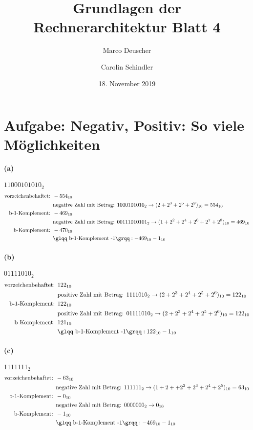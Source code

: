\documentclass[a4paper]{article}
\title{Grundlagen der Rechnerarchitektur Blatt 4}
\author{Marco Deuscher \and Carolin Schindler}
\date{18. November 2019}
\begin{document}
\maketitle
\section{Aufgabe: Negativ, Positiv: So viele Möglichkeiten}
\paragraph{(a)} $11000101010_2$
\begin{align*}
\text{vorzeichenbehaftet: } &-554_{10} \\
	&\text{negative Zahl mit Betrag: } 1000101010_{2}\rightarrow (2 + 2^3 + 2^5 + 2^9)_{10} = 554_{10} \\
\text{b-1-Komplement: } &-469_{10} \\
	&\text{negative Zahl mit Betrag: } 00111010101_{2}\rightarrow (1 + 2^2 + 2^4 + 2^6 + 2^7 + 2^8)_{10} = 469_{10} \\
\text{b-Komplement: } &-470_{10} \\
	&\text{\glqq b-1-Komplement -1\grqq}: -469_{10} -1_{10}
\end{align*}

\paragraph{(b)} $01111010_2$
\begin{align*}
\text{vorzeichenbehaftet: } &122_{10} \\
	&\text{positive Zahl mit Betrag: } 1111010_{2}\rightarrow (2 + 2^3 + 2^4 + 2^5 + 2^6)_{10} = 122_{10} \\
\text{b-1-Komplement: } &122_{10} \\
	&\text{positive Zahl mit Betrag: } 01111010_{2}\rightarrow (2 + 2^3 + 2^4 + 2^5 + 2^6)_{10} = 122_{10} \\
\text{b-Komplement: } &121_{10} \\
	&\text{\glqq b-1-Komplement -1\grqq}: 122_{10} -1_{10}
\end{align*}

\paragraph{(c)} $1111111_2$
\begin{align*}
\text{vorzeichenbehaftet: } &-63_{10} \\
	&\text{negative Zahl mit Betrag: } 111111_{2}\rightarrow (1 + 2 + +2^2 + 2^3 + 2^4 + 2^5)_{10} = 63_{10} \\
\text{b-1-Komplement: } &-0_{10} \\
&\text{negative Zahl mit Betrag: } 0000000_{2}\rightarrow 0_{10} \\
\text{b-Komplement: } &-1_{10} \\
	&\text{\glqq b-1-Komplement -1\grqq}: -469_{10} -1_{10}
\end{align*}
\end{document}
